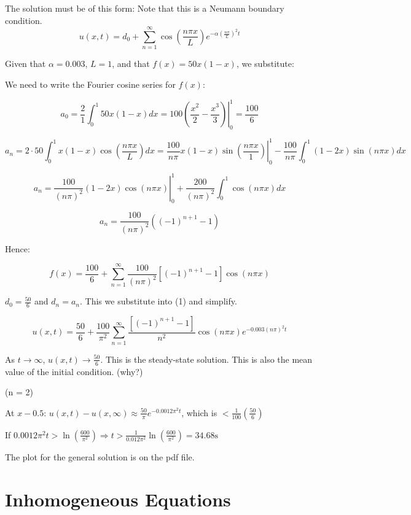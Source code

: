 \hfill

The solution must be of this form: Note that this is a Neumann boundary condition. 
\begin{equation}
    u(x,t) = d_0 + \sum_{n = 1}^\infty \cos \left(\frac{n \pi x}{L} \right) e^{- \alpha \left( \frac{n \pi }{L} \right) ^2 t}
\end{equation}

Given that $\alpha = 0.003$, $L = 1$, and that $f(x) = 50x (1-x)$, we substitute:

We need to write the Fourier cosine series for $f(x)$:

$$a_0 = \frac{2}{1} \int_0^1 50x(1-x) dx = \left. 100 \left( \frac{x^2}{2} - \frac{x^3}{3} \right) \right|_0^1 = \frac{100}{6}$$

$$a_n = 2 \cdot 50 \int_0^1 x(1-x) \cos \left( \frac{n \pi x}{L} \right) dx = \left. \frac{100}{n \pi} x (1-x) \sin  \left( \frac{n \pi x}{1} \right) \right|_0^1 - \frac{100}{n \pi} \int_0^1 (1-2x) \sin (n \pi x) dx$$

$$a_n = \left. \frac{100}{(n \pi)^2} (1 - 2x) \cos(n \pi x) \right|_0^1 + \frac{200}{(n \pi)^2} \int_0^1 \cos(n \pi x) dx$$

$$a_n = \frac{100}{(n \pi)^2} \left( (-1)^{n+1} - 1 \right)$$

Hence:

$$f(x) = \frac{100}{6} + \sum_{n = 1}^\infty \frac{100}{(n \pi)^2} \left[(-1)^{n+1} - 1 \right] \cos(n \pi x)$$

$d_0 = \frac{50}{6}$ and $d_n = a_n$. This we substitute into (1) and simplify. 


$$u(x,t) = \frac{50}{6} + \frac{100}{\pi^2} \sum_{n = 1}^\infty \frac{\left[ (-1)^{n+1} - 1 \right]}{n^2} \cos(n \pi x) e^{- 0.003 (n \pi)^2 t}$$

As $t \to \infty$, $u(x,t) \to \frac{50}{6}$. This is the steady-state solution. This is also the mean value of the initial condition. (why?)

(n = 2)
\hfill

At $x - 0.5$: $u(x,t) - u(x,\infty) \approx \frac{50}{\pi} e^{-0.0012 \pi^2 t}$, which is $< \frac{1}{100} (\frac{50}{6})$

\hfill

If $0.0012 \pi^2 t > \ln(\frac{600}{\pi^2}) \Rightarrow t > \frac{1}{0.012 \pi^2} \ln \left( \frac{600}{\pi^2} \right) = 34.68 \text{s}$

The plot for the general solution is on the pdf file. 

\section{Inhomogeneous Equations}


